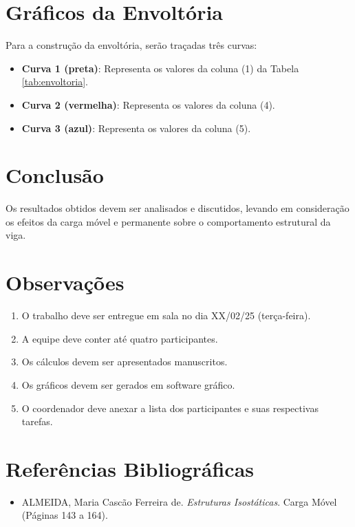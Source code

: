 \section{Gráficos da Envoltória}
Para a construção da envoltória, serão traçadas três curvas:
\begin{itemize}
    \item \textbf{Curva 1 (preta)}: Representa os valores da coluna (1) da Tabela \ref{tab:envoltoria}.
    \item \textbf{Curva 2 (vermelha)}: Representa os valores da coluna (4).
    \item \textbf{Curva 3 (azul)}: Representa os valores da coluna (5).
\end{itemize}


\section{Conclusão}
Os resultados obtidos devem ser analisados e discutidos, levando em consideração os efeitos da carga móvel e permanente sobre o comportamento estrutural da viga.


\section{Observações}
\begin{enumerate}
    \item O trabalho deve ser entregue em sala no dia XX/02/25 (terça-feira).
    \item A equipe deve conter até quatro participantes.
    \item Os cálculos devem ser apresentados manuscritos.
    \item Os gráficos devem ser gerados em software gráfico.
    \item O coordenador deve anexar a lista dos participantes e suas respectivas tarefas.
\end{enumerate}


\section{Referências Bibliográficas}
\begin{itemize}
    \item ALMEIDA, Maria Cascão Ferreira de. \textit{Estruturas Isostáticas}. Carga Móvel (Páginas 143 a 164).
\end{itemize}